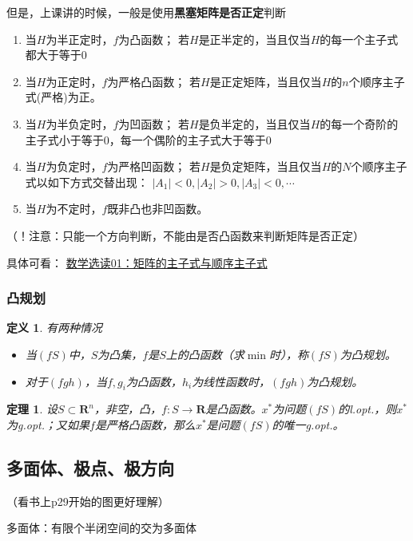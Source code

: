 \documentclass{book}
\newtheorem{theorem}{定理}[chapter]
\newtheorem{definition}{\indent 定义}[chapter]
\begin{document}
但是，上课讲的时候，一般是使用\textbf{黑塞矩阵是否正定}判断
\begin{enumerate}
    \item 当$H$为半正定时，$f$为凸函数；
          若$H$是正半定的，当且仅当$H$的每一个主子式都大于等于0
    \item 当$H$为正定时，$f$为严格凸函数；
          若$H$是正定矩阵，当且仅当$H$的$n$个顺序主子式(严格)为正。
    \item 当$H$为半负定时，$f$为凹函数；
          若$H$是负半定的，当且仅当$H$的每一个奇阶的主子式小于等于0，每一个偶阶的主子式大于等于0
    \item 当$H$为负定时，$f$为严格凹函数；
          若$H$是负定矩阵，当且仅当$H$的$N$个顺序主子式以如下方式交替出现：
          $|A_1|<0, |A_2|>0, |A_3|<0, \cdots$
    \item 当$H$为不定时，$f$既非凸也非凹函数。
\end{enumerate}
（！注意：只能一个方向判断，不能由是否凸函数来判断矩阵是否正定）

具体可看：
\href{https://zhuanlan.zhihu.com/p/594455595}{数学选读01：矩阵的主子式与顺序主子式}

\subsubsection{凸规划}

\begin{definition}
    有两种情况
    \begin{itemize}
        \item 当$(fS)$中，$S$为凸集，$f$是$S$上的凸函数（求$\min$时），称$(fS)$为凸规划。
        \item 对于$(fgh)$，当$f, g_i$为凸函数，$h_i$为线性函数时，$(fgh)$为凸规划。
    \end{itemize}
\end{definition}

\begin{theorem}
    设$S\subset \mathbf{R}^n$，非空，凸，$f:S\rightarrow\mathbf{R}$是凸函数。$x^*$为问题$(fS)$的l.opt.，则$x^*$为g.opt.；又如果$f$是严格凸函数，那么$x^*$是问题$(fS)$的唯一g.opt.。
\end{theorem}

\subsection{多面体、极点、极方向}
（看书上p29开始的图更好理解）

多面体：有限个半闭空间的交为多面体
\end{document}
